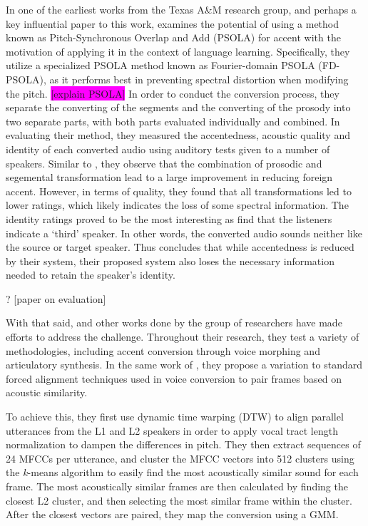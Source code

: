 \documentclass
[
    a4paper,
    twoside,
    12pt,
]
{report}
\begin{document}
In one of the earliest works from the Texas A\&M research group, and
perhaps a key influential paper to this work, \textcite{felps2009}
examines the potential of using a method known as Pitch-Synchronous
Overlap and Add (PSOLA) for accent with the motivation of applying it in
the context of language learning. Specifically, they utilize a
specialized PSOLA method known as Fourier-domain PSOLA (FD-PSOLA), as it
performs best in preventing spectral distortion when modifying the
pitch. \colorbox{magenta}{[explain PSOLA]} In order to conduct the
conversion process, they separate the converting of the segments and the
converting of the prosody into two separate parts, with both parts
evaluated individually and combined. In evaluating their method, they
measured the accentedness, acoustic quality and identity of each
converted audio using auditory tests given to a number of speakers.
Similar to \textcite{huckvale2007}, they observe that the combination of
prosodic and segemental transformation lead to a large improvement in
reducing foreign accent. However, in terms of quality, they found that
all transformations led to lower ratings, which likely indicates the
loss of some spectral information. The identity ratings proved to be the
most interesting as \textcite{felps2009} find that the listeners
indicate a `third' speaker. In other words, the converted audio sounds
neither like the source or target speaker. Thus \textcite{felps2009}
concludes that while accentedness is reduced by their system, their
proposed system also loses the necessary information needed to retain
the speaker's identity.

\colorbox{magenta}{\textcite{felps2010}} ? {[}paper on evaluation{]}

\colorbox{magenta}{\textcite{aryal2010}}

\colorbox{magenta}{\textcite{felps2012}}

With that said, \textcite{aryal2014} and other works done by the group
of researchers have made efforts to address the challenge. Throughout
their research, they test a variety of methodologies, including accent
conversion through voice morphing and articulatory synthesis. In the
same work of \textcite{aryal2014}, they propose a variation to standard
forced alignment techniques used in voice conversion to pair frames
based on acoustic similarity.

To achieve this, they first use dynamic time warping (DTW) to align
parallel utterances from the L1 and L2 speakers in order to apply vocal
tract length normalization to dampen the differences in pitch. They then
extract sequences of 24 MFCCs per utterance, and cluster the MFCC
vectors into 512 clusters using the \textit{k}-means algorithm to easily
find the most acoustically similar sound for each frame. The most
acoustically similar frames are then calculated by finding the closest
L2 cluster, and then selecting the most similar frame within the
cluster. After the closest vectors are paired, they map the conversion
using a GMM.
\end{document}
